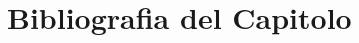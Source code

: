 
\section{Bibliografia del Capitolo}
\printbibliography[heading=none,keyword=cap5]





































